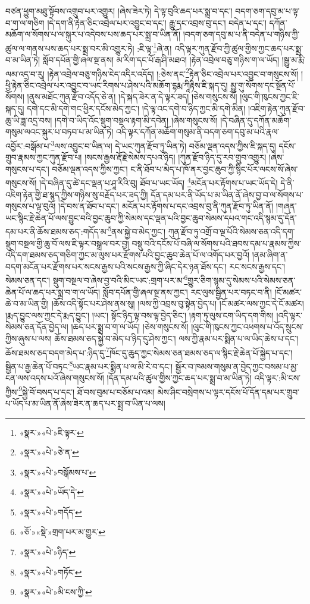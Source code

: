 བཙན་ཕྱུག་མཐུ་སྟོབས་འགྲུབ་པར་འགྱུར། །ཞེས་ཟེར་ཏེ། དེ་ལྟ་བུའི་ཆད་པར་སྨྲ་བ་དང་། བདག་ཅག་དབུ་མ་པ་ལྟ་བ་ག་ལ་གཅིག །དེ་དག་ནི་རྟེན་ཅིང་འབྲེལ་པར་འབྱུང་བ་དང་། རྒྱུ་དང་འབྲས་བུ་དང་། བདེན་པ་དང་། དཀོན་མཆོག་ལ་སོགས་པ་ལ་སྐུར་པ་འདེབས་པས་ཆད་པར་སྨྲ་བ་ཡིན་ནོ། །བདག་ཅག་དབུ་མ་པ་ནི་བདེན་པ་གཉིས་ཀྱི་ཚུལ་ལ་གནས་པས་ཆད་པར་སྨྲ་བར་མི་འགྱུར་ཏེ། :ཇི་ལྟ་\footnote{«སྣར་»«པེ་»ཇི་ལྟར་}ཞེ་ན། འདི་ལྟར་ཀུན་རྫོབ་ཀྱི་ཚུལ་གྱིས་ཀྱང་ཆད་པར་སྨྲ་བ་མ་ཡིན་ཏེ། སློབ་དཔོན་གྱི་ཞལ་སྔ་ནས། མ་རིག་དང་པོ་རྒ་ཤི་མཐའ། །རྟེན་འབྲེལ་བཅུ་གཉིས་ག་ལ་ཡོད། །སྒྱུ་མ་རྨི་ལམ་འདྲ་བ་རུ། །རྟེན་འབྲེལ་བཅུ་གཉིས་ངེད་འདིར་འདོད། །:ཅེས་ནང་\footnote{«སྣར་»«པེ་»ཅེ་ན་}རྟེན་ཅིང་འབྲེལ་པར་འབྱུང་བ་གསུངས་སོ། །ཕྱི་རྟེན་ཅིང་འབྲེལ་པར་འབྱུང་བ་ཡང་རིགས་པ་ཤེས་པའི་མཆོག་དྷརྨ་ཀཱིརྟིས་ཇི་སྐད་དུ། མྱུ་གུ་སོགས་དང་སྔོན་པོ་སོགས། །ནུས་མཐོང་ཀུན་རྫོབ་འདོད་ཅེ་ན། །དེ་སྐད་ཟེར་ན་དེ་ལྟར་ཟད། །ཅེས་གསུངས་སོ། །ལུང་གི་ཁུངས་ཀྱང་ཇི་སྐད་དུ། དགེ་དང་མི་དགེ་གང་ཕྱིར་དངོས་མེད་ཀྱང་། །དེ་ལྟ་འང་དགེ་བ་ཉིད་ཀྱང་མི་དགེ་མིན། །འཇིག་རྟེན་ཀུན་རྫོབ་ཆུ་ཡི་ཟླ་འདྲ་བས། །དགེ་བ་ཡིད་འོང་སྡུག་བསྔལ་རྟག་མི་དབེན། །ཞེས་གསུངས་སོ། །དེ་བཞིན་དུ་དཀོན་མཆོག་གསུམ་ལའང་སྐུར་པ་བཏབ་པ་མ་ཡིན་ཏེ། འདི་ལྟར་དཀོན་མཆོག་གསུམ་ནི་བདག་ཅག་དབུ་མ་པའི་རྣལ་འབྱོར་:བསྒོམ་པ་\footnote{«སྣར་»«པེ་»བསྒོམས་པ་}ལས་འབྱུང་བ་ཡིན་ལ། དེ་ཡང་ཀུན་རྫོབ་ཏུ་ཡིན་ཏེ། བཅོམ་ལྡན་འདས་ཀྱིས་ཇི་སྐད་དུ། དངོས་གྲུབ་རྣམས་ཀྱང་ཀུན་རྫོབ་པ། །སངས་རྒྱས་རྡོ་རྗེ་སེམས་དཔའ་ཉིད། །ཀུན་རྫོབ་ཉིད་དུ་རབ་གྲུབ་འགྱུར། །ཞེས་གསུངས་པ་དང་། བཅོམ་ལྡན་འདས་ཀྱིས་ཀྱང་། ང་ནི་ཐོབ་པ་མེད་པ་ཁོ་ནར་བྱང་ཆུབ་ཀྱི་སྙིང་པོར་ལངས་སོ་ཞེས་གསུངས་སོ། །དེ་བཞིན་དུ་ཚེ་དང་ལྡན་པ་ཤཱ་རིའི་བུ། ཐོབ་པ་ཡང་ཡོད། \footnote{«སྣར་»«པེ་»ཡོད་དེ་}མངོན་པར་རྟོགས་པ་ཡང་ཡོད་དེ། དེ་ནི་འཇིག་རྟེན་གྱི་ཐ་སྙད་ཀྱིས་གཉིས་སུ་བརྗོད་པར་ཟད་ཀྱི། དོན་དམ་པར་ནི་ཡོད་པ་མ་ཡིན་ནོ་ཞེས་བྱ་བ་ལ་སོགས་པ་གསུངས་པ་ལྟ་བུའོ། །དེ་བས་ན་ཐོབ་པ་དང་། མངོན་པར་རྟོགས་པ་དང་འབྲས་བུ་ནི་ཀུན་རྫོབ་ཏུ་ཡིན་ནོ། །གཞན་ཡང་སྙིང་རྗེ་ཆེན་པོ་ལས་བྱུང་བའི་བྱང་ཆུབ་ཀྱི་སེམས་དང་ལྡན་པའི་བྱང་ཆུབ་སེམས་དཔའ་གང་འདི་སྙམ་དུ་དོན་དམ་པར་ནི་ཆོས་ཐམས་ཅད་:གདོད་མ་\footnote{«སྣར་»«པེ་»གདོད་}ནས་སྐྱེ་བ་མེད་ཀྱང་། ཀུན་རྫོབ་ཏུ་འགྲོ་བ་ལྔ་པོའི་སེམས་ཅན་འདི་དག་སྡུག་བསྔལ་གྱི་ཆུ་བོ་ལས་ཇི་ལྟར་བསྒྲལ་བར་བྱ། བསྡུ་བའི་དངོས་པོ་བཞི་ལ་སོགས་པའི་ཐབས་དམ་པ་རྣམས་ཀྱིས་འདི་དག་ཐམས་ཅད་གཅིག་ཀྱང་མ་ལུས་པར་རྫོགས་པའི་བྱང་ཆུབ་ཆེན་པོ་ལ་འགོད་པར་བྱའོ། །ནམ་ཞིག་ན་བདག་མངོན་པར་རྫོགས་པར་སངས་རྒྱས་པའི་སངས་རྒྱས་ཀྱི་ཞིང་དེར་ཉན་ཐོས་དང་། རང་སངས་རྒྱས་དང་། སེམས་ཅན་དང་། སྡུག་བསྔལ་བ་ཞེས་བྱ་བའི་མིང་ཡང་:གྲག་པར་མ་\footnote{«ཅོ་»«སྡེ་»གྲག་པར་མ་གྱུར་}གྱུར་ཅིག་སྙམ་དུ་སེམས་པའི་སེམས་ཅན་ཆེན་པོ་ལ་ཆད་པར་སྨྲ་བ་ག་ལ་ཡོད། སློབ་དཔོན་གྱི་ཞལ་སྔ་ནས་ཀྱང་། རང་ལུས་སྦྱིན་པར་བཏང་བ་ནི། །ངོ་མཚར་ཆེ་བ་མ་ཡིན་གྱི། །ཆོས་འདི་སྟོང་པར་ཤེས་ནས་སུ། །ལས་ཀྱི་འབྲས་བུ་སྟེན་བྱེད་པ། །ངོ་མཚར་ལས་ཀྱང་དེ་ངོ་མཚར། །རྨད་བྱུང་ལས་ཀྱང་དེ་རྨད་བྱུང་། །ཡང་། སྟོང་ཉིད་ལྟ་བས་ལྟ་བྱེད་ཅིང་། །རྟག་ཏུ་ལུས་ངག་ཡིད་དག་གིས། །འདི་ལྟར་སེམས་ཅན་དོན་བྱེད་ལ། །ཆད་པར་སྨྲ་བ་ག་ལ་ཡོད། །ཅེས་གསུངས་སོ། །ལུང་གི་ཁུངས་ཀྱང་འཕགས་པ་འོད་སྲུངས་ཀྱིས་ཞུས་པ་ལས། ཆོས་ཐམས་ཅད་སྐྱེ་བ་མེད་པ་ཉིད་དུ་ཤེས་ཀྱང་། ལས་ཀྱི་རྣམ་པར་སྨིན་པ་ལ་ཡིད་ཆེས་པ་དང་། ཆོས་ཐམས་ཅད་བདག་མེད་པ་:ཉིད་དུ་\footnote{«སྣར་»«པེ་»ཉིད་}ཁོང་དུ་ཆུད་ཀྱང་སེམས་ཅན་ཐམས་ཅད་ལ་སྙིང་རྗེ་ཆེན་པོ་སྐྱེད་པ་དང་། སྦྱིན་པ་རྒྱ་ཆེན་པོ་བཏང་\footnote{«སྣར་»«པེ་»གཏོང་}ཡང་རྣམ་པར་སྨིན་པ་ལ་མི་རེ་བ་དང་། སྦྱོར་བ་ཁམས་གསུམ་ན་བྱེད་ཀྱང་བསམ་པ་མྱ་ངན་ལས་འདས་པའོ་ཞེས་གསུངས་སོ། །དོན་དམ་པའི་ཚུལ་གྱིས་ཀྱང་ཆད་པར་སྨྲ་བ་མ་ཡིན་ཏེ། འདི་ལྟར་:མི་ངས་ཀྱིས་\footnote{«སྣར་»«པེ་»མི་ངས་ཀྱི་}སྐྱེ་བོ་བསད་པ་དང་། ཐོ་བས་བུམ་པ་བཅོམ་པ་འམ། མེས་ཤིང་བསྲེགས་པ་ལྟར་དངོས་པོ་དོན་དམ་པར་གྲུབ་པ་ཡོད་པ་མ་ཡིན་ནོ་ཞེས་ཟེར་ན་ཆད་པར་སྨྲ་བ་ཡིན་པ་ལས། 